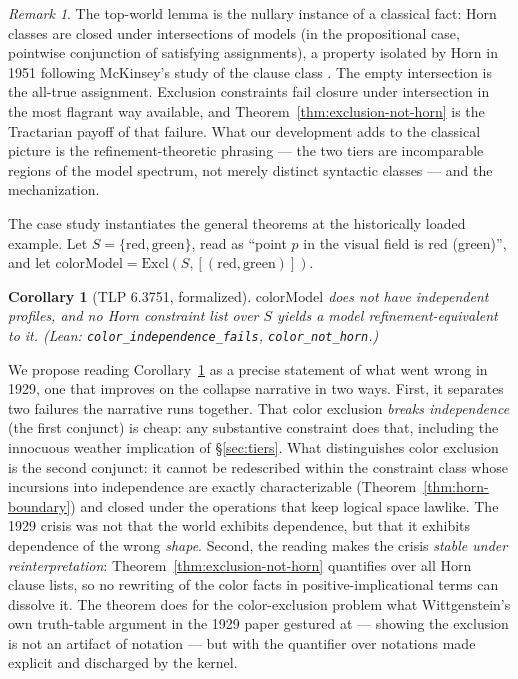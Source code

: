 \documentclass[10pt, letterpaper]{article}
\newtheorem{corollary}[theorem]{Corollary}
\theoremstyle{remark}
\newtheorem{remark}[theorem]{Remark}
\newcommand{\lean}[1]{\texttt{#1}}
\begin{document}
\begin{remark}\label{rem:horn1951}
The top-world lemma is the nullary instance of a classical fact: Horn classes
are closed under intersections of models (in the propositional case,
pointwise conjunction of satisfying assignments), a property isolated by Horn
in 1951 \cite{horn1951} following McKinsey's study of the clause class
\cite{mckinsey1943}. The empty intersection is the all-true assignment.
Exclusion constraints fail closure under intersection in the most flagrant
way available, and Theorem~\ref{thm:exclusion-not-horn} is the Tractarian
payoff of that failure. What our development adds to the classical picture is
the refinement-theoretic phrasing --- the two tiers are incomparable regions
of the model spectrum, not merely distinct syntactic classes --- and the
mechanization.
\end{remark}

The case study instantiates the general theorems at the historically loaded
example. Let $S = \{\mathrm{red}, \mathrm{green}\}$, read as ``point $p$ in
the visual field is red (green)'', and let
$\mathrm{colorModel} = \mathrm{Excl}(S, [(\mathrm{red}, \mathrm{green})])$.

\begin{corollary}[TLP 6.3751, formalized]\label{cor:color}
$\mathrm{colorModel}$ does not have independent profiles, and no Horn
constraint list over $S$ yields a model refinement-equivalent to it. (Lean:
\lean{color\_independence\_fails}, \lean{color\_not\_horn}.)
\end{corollary}

We propose reading Corollary~\ref{cor:color} as a precise statement of what
went wrong in 1929, one that improves on the collapse narrative in two ways.
First, it separates two failures the narrative runs together. That color
exclusion \emph{breaks independence} (the first conjunct) is cheap: any
substantive constraint does that, including the innocuous weather
implication of \S\ref{sec:tiers}. What distinguishes color exclusion is the
second conjunct: it cannot be redescribed within the constraint class whose
incursions into independence are exactly characterizable
(Theorem~\ref{thm:horn-boundary}) and closed under the operations that keep
logical space lawlike. The 1929 crisis was not that the world exhibits
dependence, but that it exhibits dependence of the wrong \emph{shape}.
Second, the reading makes the crisis \emph{stable under reinterpretation}:
Theorem~\ref{thm:exclusion-not-horn} quantifies over all Horn clause lists,
so no rewriting of the color facts in positive-implicational terms can
dissolve it. The theorem does for the color-exclusion problem what
Wittgenstein's own truth-table argument in the 1929 paper gestured at ---
showing the exclusion is not an artifact of notation --- but with the
quantifier over notations made explicit and discharged by the kernel.
\end{document}
